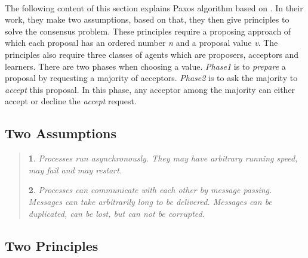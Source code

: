 \documentclass[12pt, a4paper]{article}
\makeatletter
\newtheorem*{assumption*}{\assumptionnumber}
\providecommand{\assumptionnumber}{}
\newenvironment{assumption}[2]
 {
  \renewcommand{\assumptionnumber}{Assumption #1}
  \begin{assumption*}%
  \protected@edef\@currentlabel{#1}
 }
 {
  \end{assumption*}
 }
\makeatother
\begin{document}
\paragraph{}
The following content of this section explains 
Paxos algorithm based on \cite{fischer1983consensus}. 
In their work, they make two assumptions, 
based on that, they then give principles to solve the consensus problem. 
These principles require a proposing approach 
of which each proposal has an ordered number \textit{n} 
and a proposal value \textit{v}. 
The principles also require three classes of agents 
which are proposers, acceptors and learners. 
There are two phases when choosing a value.
\textit{Phase1} is to \textit{prepare} a proposal 
by requesting a majority of acceptors. 
\textit{Phase2} is to ask the majority to \textit{accept} this proposal.
In this phase, any acceptor among the majority can 
either accept or decline the \textit{accept} request.

\subsection{Two Assumptions}
\begin{quote}
  \begin{assumption}{1}{F}\label{as:1}
    Processes run asynchronously. 
    They may have arbitrary running speed, may fail and may restart.
  \end{assumption}
  \begin{assumption}{2}{F}\label{as:2}
    Processes can communicate with each other by message passing. 
    Messages can take arbitrarily long to be delivered. 
    Messages can be duplicated, can be lost, but can not be corrupted.
  \end{assumption}
\end{quote}
\subsection{Two Principles}
\end{document}
